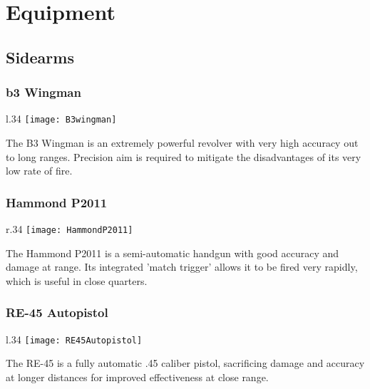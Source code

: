 \chapter{Equipment}
\label{chap:equip}


\section{Sidearms}
\label{sec:sidearms}

\subsection{b3 Wingman}

\begin{wrapfigure}[4]{l}{.34\linewidth}
\vspace*{-2em}
\texttt{[image: B3wingman]}
\end{wrapfigure}

The B3 Wingman is an extremely powerful revolver with very high accuracy out to long ranges. Precision aim is required to mitigate the disadvantages of its very low rate of fire. 

\subsection{Hammond P2011}

\begin{wrapfigure}[4]{r}{.34\linewidth}
\vspace*{-2em}
\texttt{[image: HammondP2011]}
\end{wrapfigure}

The Hammond P2011 is a semi-automatic handgun with good accuracy and damage at range. Its integrated 'match trigger' allows it to be fired very rapidly, which is useful in close quarters. 

\subsection{RE-45 Autopistol}

\begin{wrapfigure}[3]{l}{.34\linewidth}
\vspace*{-2em}
\texttt{[image: RE45Autopistol]}
\end{wrapfigure}


The RE-45 is a fully automatic .45 caliber pistol, sacrificing damage and accuracy at longer distances for improved effectiveness at close range.

